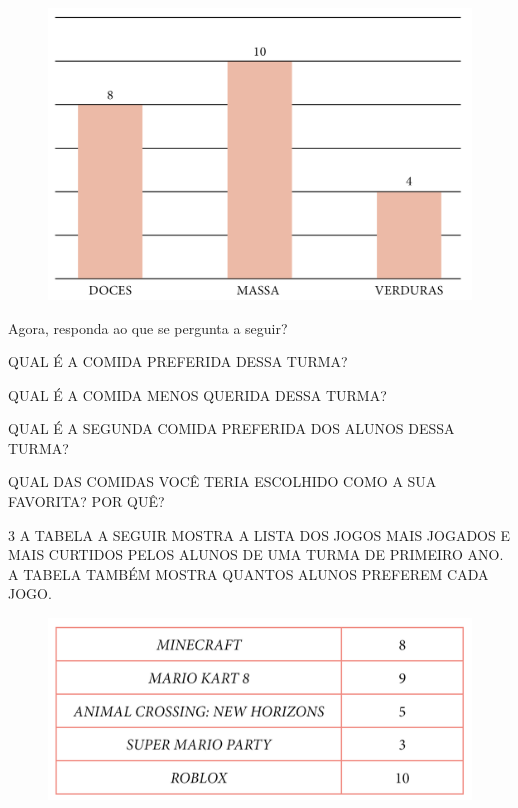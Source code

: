\begin{figure}[htpb!]
\centering
\includegraphics[width=.9\textwidth]{../ilustracoes/MAT1/SAEB_1ANO_MAT_FIGURA98.png}
\end{figure}

Agora, responda ao que se pergunta a seguir?

\begin{escolha}
\item QUAL É A COMIDA PREFERIDA DESSA TURMA?


\item QUAL É A COMIDA MENOS QUERIDA DESSA TURMA?


\item QUAL É A SEGUNDA COMIDA PREFERIDA DOS ALUNOS DESSA TURMA?


\item QUAL DAS COMIDAS VOCÊ TERIA ESCOLHIDO COMO A SUA FAVORITA? POR QUÊ?

\end{escolha}

\num{3} A TABELA A SEGUIR MOSTRA A LISTA DOS JOGOS MAIS JOGADOS E MAIS CURTIDOS PELOS
ALUNOS DE UMA TURMA DE PRIMEIRO ANO. A TABELA TAMBÉM MOSTRA QUANTOS ALUNOS PREFEREM CADA
JOGO.

\begin{figure}[htpb!]
\centering
\includegraphics[width=.6\textwidth]{../ilustracoes/MAT1/SAEB_1ANO_MAT_FIGURA99.png}
\end{figure}

